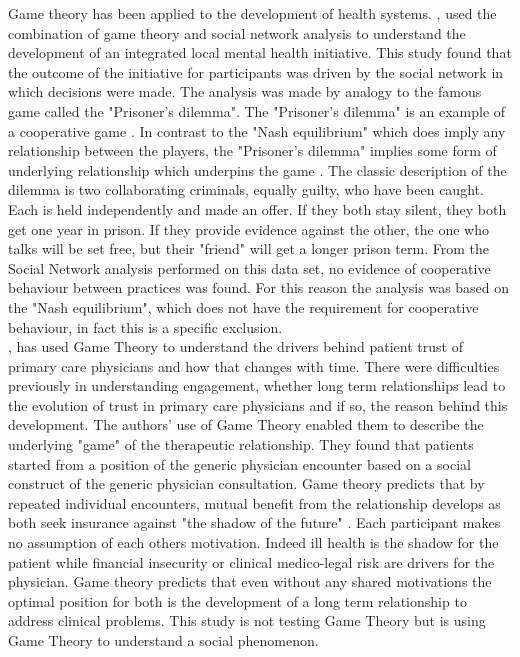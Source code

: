 \documentclass[11pt,a4paper]{article}
\begin{document}
Game theory has been applied to the development of health systems. \citep{dobson2004sustainable}, used the combination of game theory and social network analysis to understand the development of an integrated local mental health initiative. This study found that the outcome of the initiative for participants was driven by the social network in which decisions were made. The analysis was made by analogy to the famous game called the "Prisoner's dilemma". The "Prisoner's dilemma" is an example of a cooperative game \citep{binmore2007game}. In contrast to the "Nash equilibrium" which does imply any relationship between the players, the "Prisoner's dilemma" implies some form of underlying relationship which underpins the game \citep{binmore2007game}. The classic description of the dilemma is two collaborating criminals, equally guilty, who have been caught. Each is held independently and made an offer. If they both stay silent, they both get one year in prison. If they provide evidence against the other, the one who talks will be set free, but their "friend" will get a longer prison term. From the Social Network analysis performed on this data set, no evidence of cooperative behaviour between practices was found. For this reason the analysis was based on the "Nash equilibrium", which does not have the requirement for cooperative behaviour, in fact this is a specific exclusion. \\

\citet{tarrant2010continuity}, has used Game Theory to understand the drivers behind patient trust of primary care physicians and how that changes with time. There were difficulties previously in understanding engagement, whether long term relationships lead to the evolution of trust in primary care physicians and if so, the reason behind this development. The authors' use of Game Theory enabled them to describe the underlying "game" of the therapeutic relationship. They found that patients started from a position of the generic physician encounter based on a social construct of the generic physician consultation. Game theory predicts that by repeated individual encounters, mutual benefit from the relationship develops as both seek insurance against "the shadow of the future" \citep{tarrant2010continuity}. Each participant makes no assumption of each others motivation. Indeed ill health is the shadow for the patient while financial insecurity or clinical medico-legal risk  are drivers for the physician. Game theory predicts that even without any shared motivations the optimal position for both is the development of a long term relationship to address clinical problems.  This study is not testing Game Theory but is using Game Theory to understand a social phenomenon. \\
\end{document}
